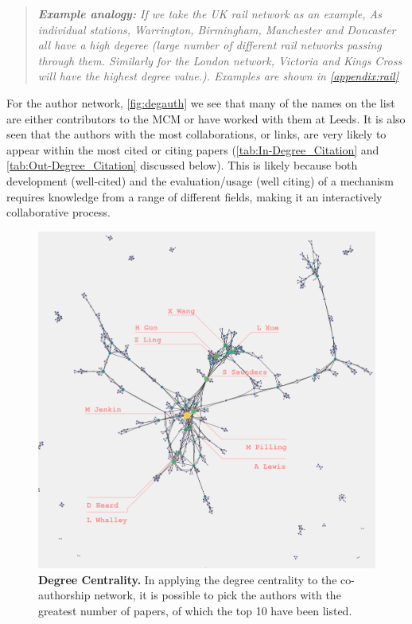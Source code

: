 \begin{quote}
\textit{
\textbf{Example analogy:} If we take the UK rail network as an example, As individual stations, Warrington, Birmingham, Manchester and Doncaster all have a high degeree (large number of different rail networks passing through them. Similarly for the London network, Victoria and Kings Cross will have the highest degree value.). Examples are shown in \autoref{appendix:rail}
}
\end{quote}

For the author network, \autoref{fig:degauth} we see that many of the names on the list are either contributors to the MCM or have worked with them at Leeds. It is also seen that the authors with the most collaborations, or links, are very likely to appear within the most cited or citing papers (\autoref{tab:In-Degree_Citation} and \autoref{tab:Out-Degree_Citation} discussed below). This is likely because both development (well-cited) and the evaluation/usage (well citing) of a mechanism requires knowledge from a range of different fields, making it an interactively collaborative process. 

\begin{figure}[H]
     \centering
         \includegraphics[width=.8\textwidth]{figures_c3/degreeauthor.png}
         
        \caption{ \textbf{Degree Centrality.} In applying the degree centrality to the co-authorship network, it is possible to pick the authors with the greatest number of papers, of which the top 10 have been listed.}
        \label{fig:degauth}
\end{figure}

